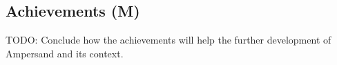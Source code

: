 
\subsection{Achievements (M)}
TODO: Conclude how the achievements will help the further development of Ampersand and its context.
